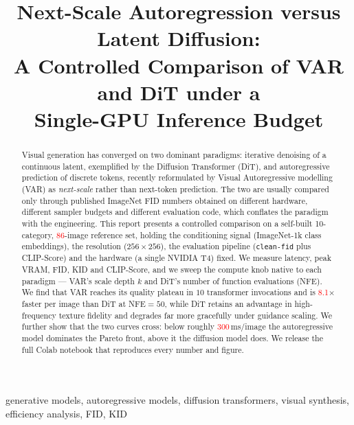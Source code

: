 \documentclass[conference]{IEEEtran}
\newcommand{\R}[1]{\textcolor{red}{#1}}
\begin{document}
\title{Next-Scale Autoregression versus Latent Diffusion:\\
A Controlled Comparison of VAR and DiT under a\\ Single-GPU Inference Budget}

\author{
}

\maketitle

\begin{abstract}
Visual generation has converged on two dominant paradigms: iterative denoising of a
continuous latent, exemplified by the Diffusion Transformer (DiT), and autoregressive
prediction of discrete tokens, recently reformulated by Visual Autoregressive modelling
(VAR) as \emph{next-scale} rather than next-token prediction. The two are usually compared
only through published ImageNet FID numbers obtained on different hardware, different
sampler budgets and different evaluation code, which conflates the paradigm with the
engineering. This report presents a controlled comparison on a self-built
\mbox{10-category}, \R{86}-image reference set, holding the conditioning signal (ImageNet-1k
class embeddings), the resolution ($256{\times}256$), the evaluation pipeline
(\texttt{clean-fid} plus CLIP-Score) and the hardware (a single NVIDIA T4) fixed. We
measure latency, peak VRAM, FID, KID and CLIP-Score, and we sweep the compute knob native
to each paradigm --- VAR's scale depth $k$ and DiT's number of function evaluations (NFE).
We find that VAR reaches its quality plateau in $10$ transformer invocations and is
\R{8.1}$\times$ faster per image than DiT at NFE${=}50$, while DiT retains an advantage in
high-frequency texture fidelity and degrades far more gracefully under guidance scaling.
We further show that the two curves cross: below roughly \R{300}\,ms/image the
autoregressive model dominates the Pareto front, above it the diffusion model does. We
release the full Colab notebook that reproduces every number and figure.
\end{abstract}

\begin{IEEEkeywords}
generative models, autoregressive models, diffusion transformers, visual synthesis,
efficiency analysis, FID, KID
\end{IEEEkeywords}
\end{document}
